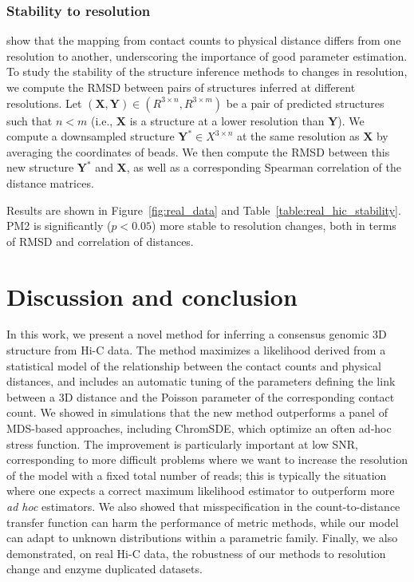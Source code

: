 \subsubsection{Stability to resolution}

\citet{zhang:spatial} show that the mapping from contact counts to
physical distance differs from one resolution to another, underscoring
the importance of good parameter estimation. To study the stability of
the structure inference methods to changes in resolution, we compute
the RMSD between pairs of structures inferred at different
resolutions.  Let $(\textbf{X}, \textbf{Y}) \in (R^{3 \times n}, R^{3
  \times m})$ be a pair of predicted structures such that $n < m$
(i.e., $\textbf{X}$ is a structure at a lower resolution than
$\textbf{Y}$). We compute a downsampled structure $\textbf{Y}^* \in
X^{3 \times n}$ at the same resolution as $\textbf{X}$ by averaging
the coordinates of beads.  We then compute the RMSD between this new
structure $\textbf{Y}^*$ and $\textbf{X}$, as well as a corresponding
Spearman correlation of the distance matrices.

Results are shown in Figure~\ref{fig:real_data} and
Table~\ref{table:real_hic_stability}. PM2 is significantly ($p < 0.05$)
more stable to resolution changes, both in terms of RMSD and correlation of
distances.

\section{Discussion and conclusion}

In this work, we present a novel method for inferring a consensus genomic 3D
structure from Hi-C data. The method maximizes a likelihood derived from a
statistical model of the relationship between the contact counts and physical
distances, and includes an automatic tuning of the parameters defining the
link between a 3D distance and the Poisson parameter of the corresponding
contact count. We showed in simulations that the new method outperforms a
panel of MDS-based approaches, including ChromSDE, which optimize an often
ad-hoc stress function. The improvement is particularly important at low SNR,
corresponding to more difficult problems where we want to increase the
resolution of the model with a fixed total number of reads; this is typically
the situation where one expects a correct maximum likelihood estimator to
outperform more {\em ad hoc} estimators. We also showed that misspecification
in the count-to-distance transfer function can harm the performance of metric
methods, while our model can adapt to unknown distributions within a
parametric family. Finally, we also demonstrated, on real Hi-C data, the
robustness of our methods to resolution change and enzyme duplicated datasets.


